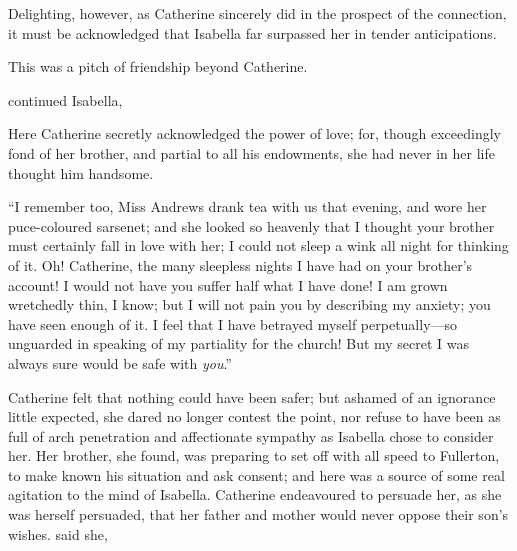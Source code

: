 Delighting, however, as Catherine sincerely did in the prospect of the connection, it must be acknowledged that Isabella far surpassed her in tender anticipations. 

This was a pitch of friendship beyond Catherine.

 continued Isabella, 

Here Catherine secretly acknowledged the power of love; for, though exceedingly fond of her brother, and partial to all his endowments, she had never in her life thought him handsome.

“I remember too, Miss Andrews drank tea with us that evening, and wore her puce-coloured sarsenet; and she looked so heavenly that I thought your brother must certainly fall in love with her; I could not sleep a wink all night for thinking of it. Oh! Catherine, the many sleepless nights I have had on your brother's account! I would not have you suffer half what I have done! I am grown wretchedly thin, I know; but I will not pain you by describing my anxiety; you have seen enough of it. I feel that I have betrayed myself perpetually---so unguarded in speaking of my partiality for the church! But my secret I was always sure would be safe with {\em you}.”

Catherine felt that nothing could have been safer; but ashamed of an ignorance little expected, she dared no longer contest the point, nor refuse to have been as full of arch penetration and affectionate sympathy as Isabella chose to consider her. Her brother, she found, was preparing to set off with all speed to Fullerton, to make known his situation and ask consent; and here was a source of some real agitation to the mind of Isabella. Catherine endeavoured to persuade her, as she was herself persuaded, that her father and mother would never oppose their son's wishes.  said she, 

